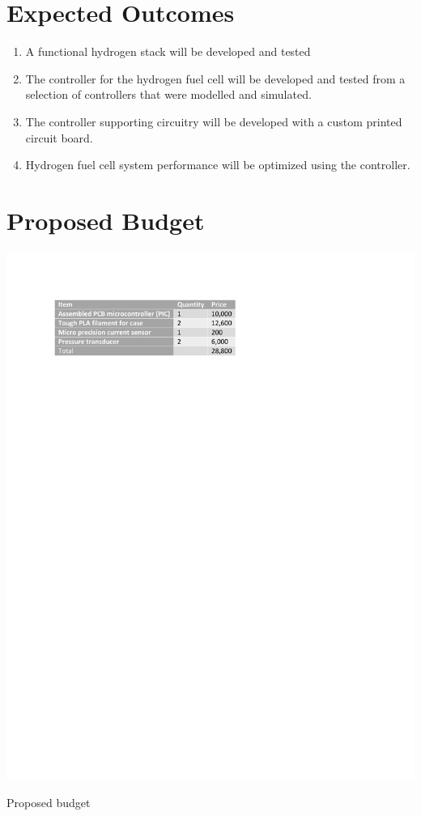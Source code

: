 \section{Expected Outcomes}
\begin{enumerate}
\item A functional hydrogen stack will be developed and tested
\item The controller for the hydrogen fuel cell will be developed and tested from a selection of controllers that were modelled and simulated.
\item The controller supporting circuitry will be developed with a custom printed circuit board.
\item Hydrogen fuel cell system performance will be optimized using the controller.
\end{enumerate}
\section{Proposed Budget}
\begin{table}[!h]
\includegraphics{Figures/budget}
\caption{Proposed budget}
\end{table}
